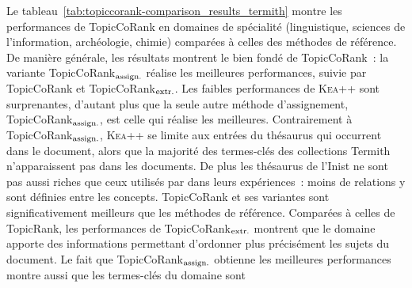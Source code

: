         Le tableau~\ref{tab:topiccorank-comparison_results_termith} montre les
        performances de TopicCoRank en domaines de spécialité (linguistique,
        sciences de l'information, archéologie, chimie) comparées à celles des
        méthodes de référence. De manière générale, les résultats montrent le
        bien fondé de TopicCoRank~: la variante
        TopicCoRank$_\textnormal{assign.}$ réalise les meilleures performances,
        suivie par TopicCoRank et TopicCoRank$_\textnormal{extr.}$. Les faibles
        performances de \textsc{Kea++} sont surprenantes, d'autant plus que la
        seule autre méthode d'assignement, TopicCoRank$_\textnormal{assign.}$,
        est celle qui réalise les meilleures. Contrairement à
        TopicCoRank$_\textnormal{assign.}$, \textsc{Kea++} se limite aux entrées
        du thésaurus qui occurrent dans le document, alors que la majorité des
        termes-clés des collections Termith n'apparaissent pas dans les
        documents. De plus les thésaurus de l'Inist ne sont pas aussi riches que
        ceux utilisés par  dans leurs expériences~:
        moins de relations y sont définies entre les concepts. TopicCoRank et
        ses variantes sont significativement meilleurs que les méthodes de
        référence. Comparées à celles de TopicRank, les performances de
        TopicCoRank$_\textnormal{extr.}$ montrent que le domaine apporte des
        informations permettant d'ordonner plus précisément les sujets du
        document. Le fait que TopicCoRank$_\textnormal{assign.}$ obtienne les
        meilleures performances montre aussi que les termes-clés du domaine sont
